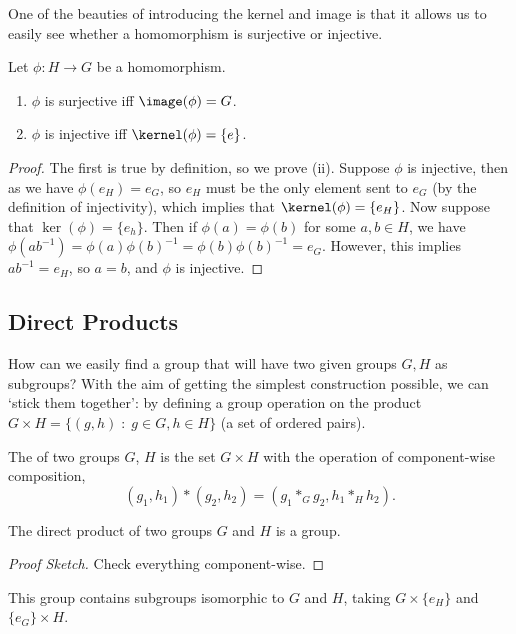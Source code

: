 \documentclass[a4]{scrreprt}
\newcommand{\newsubsection}{\subsection}
\begin{document}
One of the beauties of introducing the kernel and image is that it allows us to easily see whether a homomorphism is surjective or injective.

\begin{proposition}
	Let $\phi : H \rightarrow G$ be a homomorphism.
	\begin{enumerate}[label=(\roman*)]
		\item $\phi$ is surjective iff $\image(\phi) = G$.
		\item $\phi$ is injective iff $\kernel(\phi) = \{e\}$.
	\end{enumerate}	
\end{proposition}
\begin{proof}
	The first is true by definition, so we prove (ii). Suppose $\phi$ is injective, then as we have $\phi(e_H) = e_G$, so $e_H$ must be the only element sent to $e_G$ (by the definition of injectivity), which implies that $\kernel(\phi) = \{ e_H \}$.
	Now suppose that $\ker(\phi) = \{ e_h \}$. Then if $\phi(a) = \phi(b)$ for some $a, b \in H$, we  have $\phi(ab^{-1}) = \phi(a)\phi(b)^{-1} = \phi(b)\phi(b)^{-1} = e_G$. However, this implies $ab^{-1} = e_H$, so $a = b$, and $\phi$ is injective.
\end{proof}



\newsubsection{Direct Products}

How can we easily find a group that will have two given groups $G, H$ as subgroups?
With the aim of getting the simplest construction possible, we can `stick them together': by defining a group operation on the product $G \times H = \{ (g, h)  \; : \; g \in G, h \in H\}$ (a set of ordered pairs).

\begin{definition}
	The  of two groups $G$, $H$ is the set $G \times H$ with the operation of component-wise composition,
	$$
	(g_1, h_1) * (g_2, h_2) = (g_1 *_G g_2, h_1 *_H h_2).
	$$
\end{definition}

\begin{proposition}
	The direct product of two groups $G$ and $H$ is a group.
\end{proposition}
\begin{proof}[Proof Sketch]
	Check everything component-wise.
\end{proof}

This group contains subgroups isomorphic to $G$ and $H$, taking $G \times \{ e_H \}$ and $\{ e_G \} \times H$.
\end{document}
